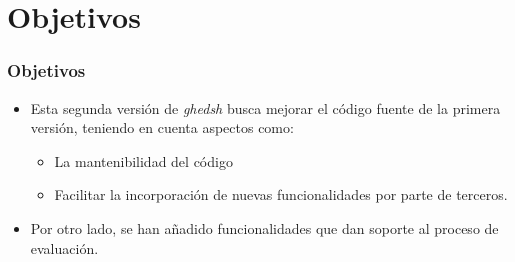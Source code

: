 \documentclass{beamer}
\begin{document}

\section{Objetivos}
\begin{frame}[fragile]
  \frametitle{Objetivos}
  
  \begin{itemize}
    \item Esta segunda versión de {\it ghedsh} busca mejorar el código fuente de la primera versión,
  teniendo en cuenta aspectos como:
  \begin{itemize}
    \item La mantenibilidad del código 
    \item Facilitar la incorporación de nuevas funcionalidades por parte de terceros.
  \end{itemize}
    \item Por otro lado, se han añadido funcionalidades que dan soporte al proceso de evaluación.
  \end{itemize}
\end{frame}

\end{document}
